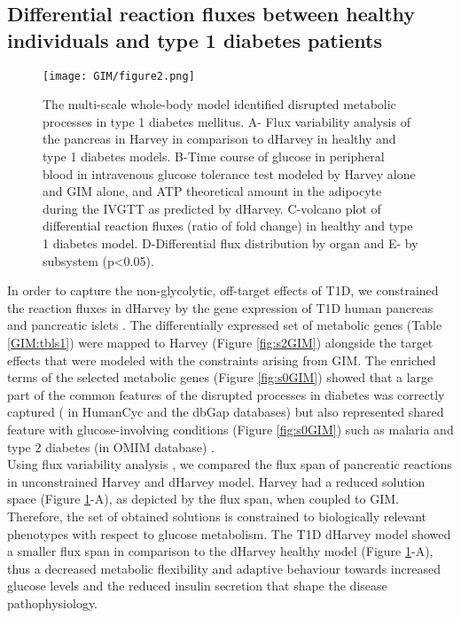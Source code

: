 \subsection{Differential reaction fluxes between healthy individuals and type 1 diabetes patients}
\begin{figure}[!htp]
\centering
	\texttt{[image: GIM/figure2.png]}%
	\caption[Differential metabolic fluxes between T1D and healthy.]{The multi-scale whole-body model identified disrupted metabolic processes in type 1 diabetes mellitus. A- Flux variability analysis of the pancreas in Harvey in comparison to dHarvey in healthy and type 1 diabetes models. B-Time course of glucose in peripheral blood in intravenous glucose tolerance test modeled by Harvey alone and GIM alone, and ATP theoretical amount in the adipocyte during the IVGTT as predicted by dHarvey. C-volcano plot of differential reaction fluxes (ratio of fold change) in healthy and type 1 diabetes model. D-Differential flux distribution by organ and E- by subsystem (p<0.05).}
	\label{fig:GIM2}
\end{figure}
In order to capture the non-glycolytic, off-target effects of T1D, we constrained the reaction fluxes in dHarvey by the gene expression of T1D human pancreas and pancreatic islets \cite{planas2010gene}. The differentially expressed set of metabolic genes (Table \ref{GIM:tbls1}) were mapped to Harvey (Figure \ref{fig:s2GIM}) alongside the target effects that were modeled with the constraints arising from GIM. The enriched terms of the selected metabolic genes (Figure \ref{fig:s0GIM}) showed that a large part of the common features of the disrupted processes in diabetes was correctly captured ( in HumanCyc \cite{romero2005computational} and the dbGap \cite{mailman2007ncbi} databases) but also represented shared feature with glucose-involving conditions (Figure \ref{fig:s0GIM}) such as malaria \cite{ogetii2010hypoglycaemia} and type 2 diabetes (in OMIM database) \cite{mailman2007ncbi}.\\
Using flux variability analysis \cite{mahadevan2003effects}, we compared the flux span of pancreatic reactions in unconstrained Harvey and dHarvey model. Harvey had a reduced solution space (Figure \ref{fig:GIM2}-A), as depicted by the flux span, when coupled to GIM. Therefore, the set of obtained solutions is constrained to biologically relevant phenotypes with respect to glucose metabolism. The T1D dHarvey model showed a smaller flux span in comparison to the dHarvey healthy model  (Figure \ref{fig:GIM2}-A), thus a decreased metabolic flexibility and adaptive behaviour towards increased glucose levels and the reduced insulin secretion that shape the disease pathophysiology.

